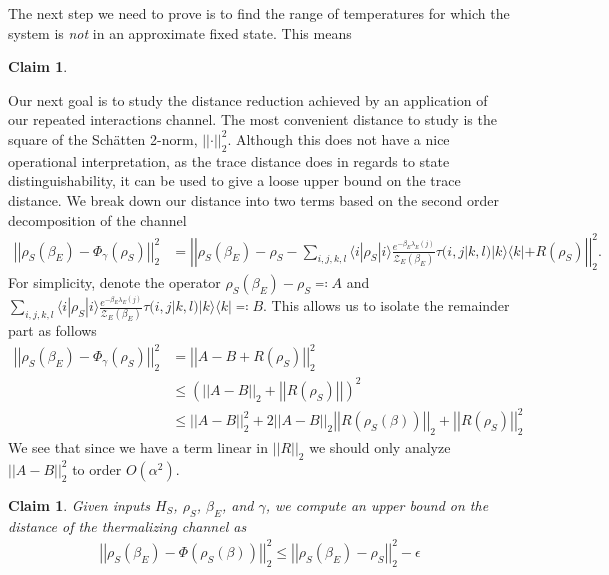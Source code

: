 \documentclass{article}
\newtheorem{claim}[theorem]{Claim}
\newcommand{\ket}[1]{|#1\rangle}
\newcommand{\bra}[1]{\langle #1|}
\newcommand{\ketbra}[2]{| #1\rangle\! \langle #2|}
\newcommand{\parens}[1]{\left( #1 \right)}
\newcommand{\norm}[1]{\left| \left| #1 \right| \right|}
\newcommand{\bigo}[1]{O\left( #1 \right)}
\newcommand{\partfun}{\mathcal{Z}}
\begin{document}
The next step we need to prove is to find the range of temperatures for which the system is \emph{ not} in an approximate fixed state. This means
\begin{claim}
    
\end{claim}

Our next goal is to study the distance reduction achieved by an application of our repeated interactions channel. The most convenient distance to study is the square of the Sch\"{a}tten 2-norm, $\norm{\cdot}_2^2$. Although this does not have a nice operational interpretation, as the trace distance does in regards to state distinguishability, it can be used to give a loose upper bound on the trace distance. We break down our distance into two terms based on the second order decomposition of the channel
\begin{align}
    \norm{\rho_S(\beta_E) - \Phi_{\gamma}(\rho_S)}_2^2 &= \norm{\rho_S(\beta_E) - \rho_S - \sum_{i, j, k, l} \bra{i} \rho_S \ket{i} \frac{e^{-\beta_E \lambda_E(j)}}{\partfun_E(\beta_E)}   \tau(i, j| k,l) \ketbra{k}{k} + R(\rho_S)}_2^2.
\end{align}
For simplicity, denote the operator $\rho_S(\beta_E) - \rho_S \eqqcolon A$ and $\sum_{i, j, k, l} \bra{i} \rho_S \ket{i} \frac{e^{-\beta_E \lambda_E(j)}}{\partfun_E(\beta_E)} \tau(i, j| k,l) \ketbra{k}{k} \eqqcolon B$. This allows us to isolate the remainder part as follows
\begin{align}
    \norm{\rho_S(\beta_E) - \Phi_\gamma(\rho_S)}_2^2 &= \norm{A - B + R(\rho_S)}_2^2 \\
    &\leq \parens{\norm{A - B}_2 + \norm{R(\rho_S)}}^2 \\
    &\leq \norm{A - B}_2^2 + 2 \norm{A - B}_2 \norm{R(\rho_S(\beta))}_2 + \norm{R(\rho_S)}_2^2
\end{align}
We see that since we have a term linear in $\norm{R}_2$ we should only analyze $\norm{A - B}_2^2$ to order $\bigo{\alpha^2}$. 

\begin{claim}
    Given inputs $H_S$, $\rho_S$, $\beta_E$, and $\gamma$, we compute an upper bound on the distance of the thermalizing channel as
    \begin{align}
        \norm{\rho_S(\beta_E) - \Phi(\rho_S(\beta))}_2^2 \leq \norm{\rho_S(\beta_E) - \rho_S}_2^2 - \epsilon
    \end{align}
    
\end{claim}
\end{document}
